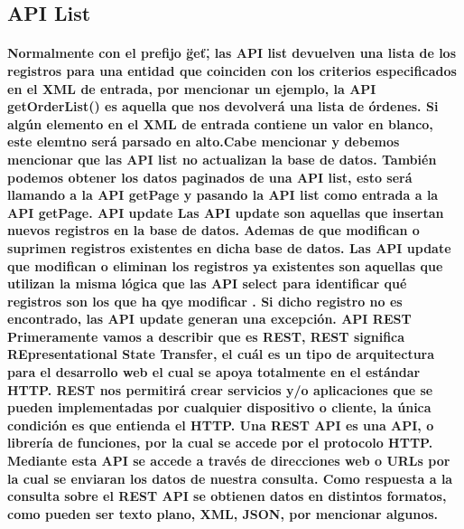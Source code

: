   \subsection{API List}
    \paragraph{Normalmente con el prefijo \"get\", las API list devuelven una lista de los registros para una entidad que coinciden con los criterios especificados en el XML de entrada, por mencionar un ejemplo, la API getOrderList() es aquella que nos devolverá una lista de órdenes. Si algún elemento en el XML de entrada contiene un valor en blanco, este elemtno será parsado en alto.Cabe mencionar y debemos mencionar que las API list no actualizan la base de datos. También podemos obtener los datos paginados de una API list, esto será llamando a la API getPage y pasando la API list como entrada a la API getPage. API update Las API update son aquellas que insertan nuevos registros en la base de datos. Ademas de que modifican o suprimen registros existentes en dicha base de datos. Las API update que modifican o eliminan los registros ya existentes son aquellas que utilizan la misma lógica que las API select para identificar qué registros son los que ha qye modificar . Si dicho registro no es encontrado, las API update generan una excepción. API REST Primeramente vamos a describir que es REST, REST significa REpresentational State Transfer, el cuál es un tipo de arquitectura para el desarrollo web el cual se apoya totalmente en el estándar HTTP. REST nos permitirá crear servicios y/o aplicaciones que se pueden implementadas por cualquier dispositivo o cliente, la única condición es que entienda el HTTP. Una REST API es una API, o librería de funciones, por la cual se accede por el protocolo HTTP. Mediante esta API se accede a través de direcciones web o URLs por la cual se enviaran los datos de nuestra consulta. Como respuesta a la consulta sobre el REST API se obtienen datos en distintos formatos, como pueden ser texto plano, XML, JSON, por mencionar algunos. }